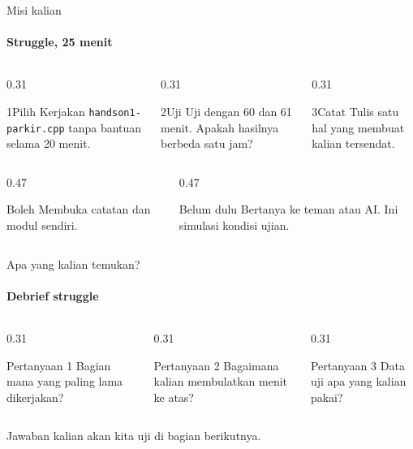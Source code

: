 \documentclass[t]{beamer}
\begin{document}
\begin{frame}{Misi kalian}
\framesubtitle{Struggle, 25 menit}
\begin{columns}[T]
\begin{column}{0.31\textwidth}
\begin{Langkah}{1}{Pilih}
Kerjakan \texttt{handson1-parkir.cpp} tanpa bantuan selama 20 menit.
\end{Langkah}
\end{column}
\begin{column}{0.31\textwidth}
\begin{Langkah}{2}{Uji}
Uji dengan 60 dan 61 menit. Apakah hasilnya berbeda satu jam?
\end{Langkah}
\end{column}
\begin{column}{0.31\textwidth}
\begin{Langkah}{3}{Catat}
Tulis satu hal yang membuat kalian tersendat.
\end{Langkah}
\end{column}
\end{columns}
\vspace{8pt}
\begin{columns}[T]
\begin{column}{0.47\textwidth}
\begin{Blok}{Boleh}
Membuka catatan dan modul sendiri.
\end{Blok}
\end{column}
\begin{column}{0.47\textwidth}
\begin{BlokAlert}{Belum dulu}
Bertanya ke teman atau AI. Ini simulasi kondisi ujian.
\end{BlokAlert}
\end{column}
\end{columns}
\end{frame}

\begin{frame}{Apa yang kalian temukan?}
\framesubtitle{Debrief struggle}
\begin{columns}[T]
\begin{column}{0.31\textwidth}
\begin{BlokGelap}{Pertanyaan 1}
Bagian mana yang paling lama dikerjakan?
\end{BlokGelap}
\end{column}
\begin{column}{0.31\textwidth}
\begin{BlokGelap}{Pertanyaan 2}
Bagaimana kalian membulatkan menit ke atas?
\end{BlokGelap}
\end{column}
\begin{column}{0.31\textwidth}
\begin{BlokGelap}{Pertanyaan 3}
Data uji apa yang kalian pakai?
\end{BlokGelap}
\end{column}
\end{columns}
\vspace{10pt}
Jawaban kalian akan kita uji di bagian berikutnya.
\end{frame}
\end{document}
